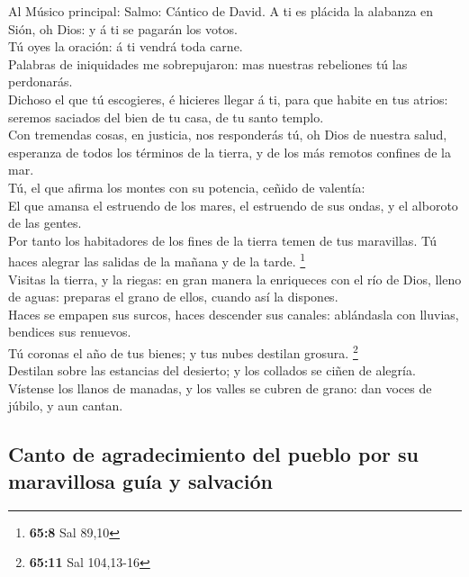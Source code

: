  Al Músico principal: Salmo: Cántico de David. A ti es
plácida la alabanza en Sión, oh Dios: y á ti se pagarán los votos.\\
 Tú oyes la oración: á ti vendrá toda carne.\\
 Palabras de iniquidades me sobrepujaron: mas nuestras
rebeliones tú las perdonarás.\\
 Dichoso el que tú escogieres, é hicieres llegar á ti, para
que habite en tus atrios: seremos saciados del bien de tu casa, de tu
santo templo.\\
 Con tremendas cosas, en justicia, nos responderás tú, oh
Dios de nuestra salud, esperanza de todos los términos de la tierra, y
de los más remotos confines de la mar.\\
 Tú, el que afirma los montes con su potencia, ceñido de
valentía:\\
 El que amansa el estruendo de los mares, el estruendo de
sus ondas, y el alboroto de las gentes.\\
 Por tanto los habitadores de los fines de la tierra temen
de tus maravillas. Tú haces alegrar las salidas de la mañana y de la
tarde. \footnote{\textbf{65:8} Sal 89,10}\\
 Visitas la tierra, y la riegas: en gran manera la
enriqueces con el río de Dios, lleno de aguas: preparas el grano de
ellos, cuando así la dispones.\\
 Haces se empapen sus surcos, haces descender sus canales:
ablándasla con lluvias, bendices sus renuevos.\\
 Tú coronas el año de tus bienes; y tus nubes destilan
grosura. \footnote{\textbf{65:11} Sal 104,13-16}\\
 Destilan sobre las estancias del desierto; y los collados
se ciñen de alegría.\\
 Vístense los llanos de manadas, y los valles se cubren de
grano: dan voces de júbilo, y aun cantan.

\hypertarget{canto-de-agradecimiento-del-pueblo-por-su-maravillosa-guuxeda-y-salvaciuxf3n}{%
\subsection{Canto de agradecimiento del pueblo por su maravillosa guía y
salvación}\label{canto-de-agradecimiento-del-pueblo-por-su-maravillosa-guuxeda-y-salvaciuxf3n}}

